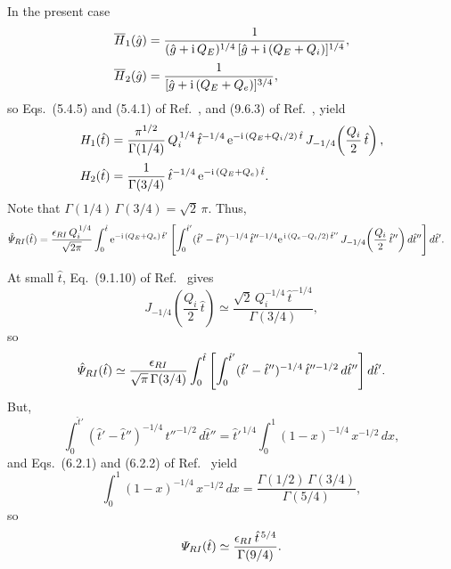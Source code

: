 \documentclass[12pt,prb,aps]{revtex4-1}
\begin{document}
In the present case
\begin{align}
\overline{H}_1(\hat{g}) &= \frac{1}{(\hat{g}+{\rm i}\,Q_E)^{1/4}\,[\hat{g}+ {\rm i}\,(Q_E+Q_i)]^{1/4}},\\[0.5ex]
\overline{H}_2(\hat{g}) &= \frac{1}{[\hat{g}+{\rm i}\,(Q_E+Q_e)]^{3/4}},
\end{align}
so Eqs.~(5.4.5) and (5.4.1) of Ref.~, and (9.6.3) of Ref.~, yield 
\begin{align}
H_1(\hat{t}) &= \frac{\pi^{1/2}}{\Gamma(1/4)}\,Q_i^{\,1/4}\,\hat{t}^{-1/4}\,{\rm e}^{-{\rm i}\,(Q_E+Q_i/2)\,\hat{t}}\,J_{-1/4}\!\left(\frac{Q_i}{2}\,\hat{t}\right),\\[0.5ex]
H_2(\hat{t})&= \frac{1}{\Gamma(3/4)}\,\hat{t}^{-1/4}\,{\rm e}^{-{\rm i}\,(Q_E+Q_e)\,\hat{t}}.
\end{align}
Note that
$\Gamma(1/4)\,\Gamma(3/4) = \sqrt{2}\,\pi$.
Thus,
\begin{align}\label{rip}
\hat{\mit\Psi}_{RI}(\hat{t}) &= \frac{\epsilon_{RI}\,Q_i^{\,1/4}}{\sqrt{2\pi}}\int_0^{\hat{t}}{\rm e}^{-{\rm i}\,(Q_E+Q_e)\,\hat{t}'}\left[
\int_0^{\hat{t}'}(\hat{t}'-\hat{t}'')^{-1/4}\,\hat{t}''^{-1/4}
{\rm e}^{\,{\rm i}\,(Q_e-Q_i/2)\,\hat{t}''}\,J_{-1/4}\!\left(\frac{Q_i}{2}\,\hat{t}''\right)d\hat{t}''\right]d\hat{t}'.
\end{align}

At small $\hat{t}$, Eq.~(9.1.10) of Ref.~ gives
\begin{equation}
J_{-1/4}\!\left(\frac{Q_i}{2}\,\hat{t}\right)\simeq\frac{\sqrt{2}\,Q_i^{-1/4}\,\hat{t}^{-1/4}}{\Gamma(3/4)},
\end{equation}
so
\begin{equation}
\hat{\mit\Psi}_{RI}(\hat{t})\simeq \frac{\epsilon_{RI}}{\sqrt{\pi}\,\Gamma(3/4)}
\int_0^{\hat{t}}\left[\int_0^{\hat{t}'}(\hat{t}'-\hat{t}'')^{-1/4}\,\hat{t}''^{-1/2}\,d\hat{t}''\right]d\hat{t}'.
\end{equation}
But,
\begin{equation}
\int_0^{\hat{t}'}(\hat{t}'-\hat{t}'')^{-1/4}\,\hat{t}''^{-1/2}\,d\hat{t}''=\hat{t}'^{\,1/4}\int_0^1(1-x)^{-1/4}\,x^{-1/2}\,dx,
\end{equation}
and Eqs.~(6.2.1) and (6.2.2) of Ref.~ yield
\begin{equation}
\int_0^1(1-x)^{-1/4}\,x^{-1/2}\,dx =\frac{\Gamma(1/2)\,\Gamma(3/4)}{\Gamma(5/4)},
\end{equation}
so
\begin{equation}\label{ris}
{\mit\Psi}_{RI}(\hat{t})\simeq \frac{\epsilon_{RI}\,\hat{t}^{\,5/4}}{\Gamma(9/4)}.
\end{equation}
\end{document}
